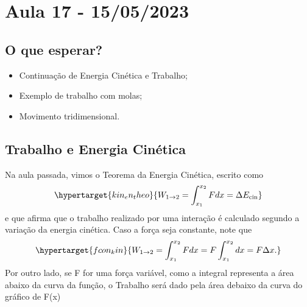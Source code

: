 \documentclass[physics_notes.tex]{subfiles}
\begin{document}
\section{Aula 17 - 15/05/2023}
\subsection{O que esperar?}
\begin{itemize}
	\item Continuação de Energia Cinética e Trabalho;
	\item Exemplo de trabalho com molas;
	\item Movimento tridimensional.
\end{itemize}
\subsection{Trabalho e Energia Cinética}
Na aula passada, vimos o Teorema da Energia Cinética, escrito como
\[
	\hypertarget{kin_en_theo}{W_{1\rightarrow 2} = \int_{x_1}^{x_2}Fdx = \Delta E_{\text{cin}}}
\]
e que afirma que o trabalho realizado por uma interação é calculado segundo a variação
da energia cinética. Caso a força seja constante, note que
\[
	\hypertarget{fcon_kin}{W_{1\rightarrow 2} = \int_{x_1}^{x_2} Fdx = F\int_{x_1}^{x_2}dx = F\Delta x.}
\]
Por outro lado, se F for uma força variável, como a integral representa a área
abaixo da curva da função, o Trabalho será dado pela área debaixo da curva do
gráfico de F(x)

\end{document}
